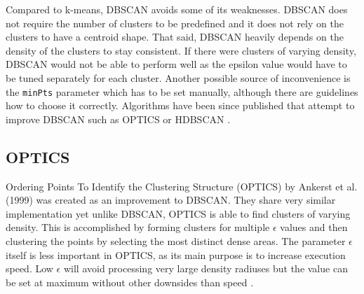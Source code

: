 Compared to k-means, DBSCAN avoids some of its weaknesses. DBSCAN does not require the number of clusters to be predefined and it does not rely on the clusters to have a centroid shape. That said, DBSCAN heavily depends on the density of the clusters to stay consistent. If there were clusters of varying density, DBSCAN would not be able to perform well as the epsilon value would have to be tuned separately for each cluster. Another possible source of inconvenience is the \texttt{minPts} parameter which has to be set manually, although there are guidelines how to choose it correctly. Algorithms have been since published that attempt to improve DBSCAN such as OPTICS or HDBSCAN \cite{ma-kmeans-dbscan-timeseries, data-mining-2011}.

\subsection{OPTICS}
\label{ssec:optics}

Ordering Points To Identify the Clustering Structure (OPTICS) by Ankerst et al. (1999) \cite{optics-1999} was created as an improvement to DBSCAN. They share very similar implementation yet unlike DBSCAN, OPTICS is able to find clusters of varying density. This is accomplished by forming clusters for multiple $\epsilon$ values and then clustering the points by selecting the most distinct dense areas. The parameter $\epsilon$ itself is less important in OPTICS, as its main purpose is to increase execution speed. Low $\epsilon$ will avoid processing very large density radiuses but the value can be set at maximum without other downsides than speed \cite{optics-1999, data-mining-2011}.

